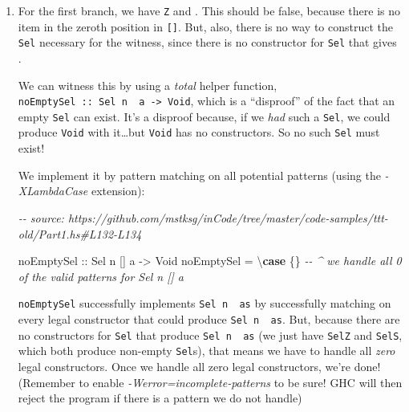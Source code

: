 \documentclass[]{article}
\newenvironment{Shaded}{}{}
\newcommand{\CommentTok}[1]{\textcolor[rgb]{0.38,0.63,0.69}{\textit{#1}}}
\newcommand{\DataTypeTok}[1]{\textcolor[rgb]{0.56,0.13,0.00}{#1}}
\newcommand{\KeywordTok}[1]{\textcolor[rgb]{0.00,0.44,0.13}{\textbf{#1}}}
\newcommand{\NormalTok}[1]{#1}
\newcommand{\OtherTok}[1]{\textcolor[rgb]{0.00,0.44,0.13}{#1}}
\begin{document}
\begin{enumerate}
\def\labelenumi{\arabic{enumi}.}
\item
  For the first branch, we have \texttt{\textquotesingle{}Z} and
  \texttt{\textquotesingle{}{[}{]}}. This should be false, because there is no
  item in the zeroth position in \texttt{{[}{]}}. But, also, there is no way to
  construct the \texttt{Sel} necessary for the witness, since there is no
  constructor for \texttt{Sel} that gives \texttt{\textquotesingle{}{[}{]}}.

  We can witness this by using a \emph{total} helper function,
  \texttt{noEmptySel\ ::\ Sel\ n\ \textquotesingle{}{[}{]}\ a\ -\textgreater{}\ Void},
  which is a ``disproof'' of the fact that an empty \texttt{Sel} can exist. It's
  a disproof because, if we \emph{had} such a \texttt{Sel}, we could produce
  \texttt{Void} with it\ldots but \texttt{Void} has no constructors. So no such
  \texttt{Sel} must exist!

  We implement it by pattern matching on all potential patterns (using the
  \emph{-XLambdaCase} extension):

\begin{Shaded}
\begin{Highlighting}[]
\CommentTok{{-}{-} source: https://github.com/mstksg/inCode/tree/master/code{-}samples/ttt{-}old/Part1.hs\#L132{-}L134}

\OtherTok{noEmptySel ::} \DataTypeTok{Sel}\NormalTok{ n \textquotesingle{}[] a }\OtherTok{{-}\textgreater{}} \DataTypeTok{Void}
\NormalTok{noEmptySel }\OtherTok{=}\NormalTok{ \textbackslash{}}\KeywordTok{case}\NormalTok{ \{\}}
            \CommentTok{{-}{-} \^{} we handle all 0 of the valid patterns for Sel n \textquotesingle{}[] a}
\end{Highlighting}
\end{Shaded}

  \texttt{noEmptySel} successfully implements
  \texttt{Sel\ n\ \textquotesingle{}{[}{]}\ as} by successfully matching on
  every legal constructor that could produce
  \texttt{Sel\ n\ \textquotesingle{}{[}{]}\ as}. But, because there are no
  constructors for \texttt{Sel} that produce
  \texttt{Sel\ n\ \textquotesingle{}{[}{]}\ as} (we just have \texttt{SelZ} and
  \texttt{SelS}, which both produce non-empty \texttt{Sel}s), that means we have
  to handle all \emph{zero} legal constructors. Once we handle all zero legal
  constructors, we're done! (Remember to enable
  \emph{-Werror=incomplete-patterns} to be sure! GHC will then reject the
  program if there is a pattern we do not handle)


\end{enumerate}
\end{document}
